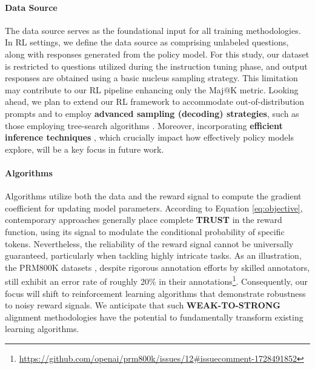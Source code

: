 \begin{itemize}[topsep=0pt]
\begin{itemize}[topsep=0pt]
\paragraph{Data Source} The data source serves as the foundational input for all training methodologies. In RL settings, we define the data source as comprising unlabeled questions, along with responses generated from the policy model. For this study, our dataset is restricted to questions utilized during the instruction tuning phase, and output responses are obtained using a basic nucleus sampling strategy. This limitation may contribute to our RL pipeline enhancing only the Maj@K metric. Looking ahead, we plan to extend our RL framework to accommodate out-of-distribution prompts and to employ \textbf{advanced sampling (decoding) strategies}, such as those employing tree-search algorithms \citep{yao2023tree}. Moreover, incorporating \textbf{efficient inference techniques} \citep{xia-etal-2023-speculative,leviathan2023fast,kwon2023efficient,xia2024unlocking}, which crucially impact how effectively policy models explore, will be a key focus in future work.

\paragraph{Algorithms} Algorithms utilize both the data and the reward signal to compute the gradient coefficient for updating model parameters. According to Equation \ref{eq:objective}, contemporary approaches generally place complete \textbf{TRUST} in the reward function, using its signal to modulate the conditional probability of specific tokens. Nevertheless, the reliability of the reward signal cannot be universally guaranteed, particularly when tackling highly intricate tasks. As an illustration, the PRM800K datasets \citep{lightman2023let}, despite rigorous annotation efforts by skilled annotators, still exhibit an error rate of roughly 20\% in their annotations\footnote{\url{https://github.com/openai/prm800k/issues/12\#issuecomment-1728491852}}. Consequently, our focus will shift to reinforcement learning algorithms that demonstrate robustness to noisy reward signals. We anticipate that such \textbf{WEAK-TO-STRONG} \citep{burns2023weak} alignment methodologies have the potential to fundamentally transform existing learning algorithms.


\end{itemize}
\end{itemize}
